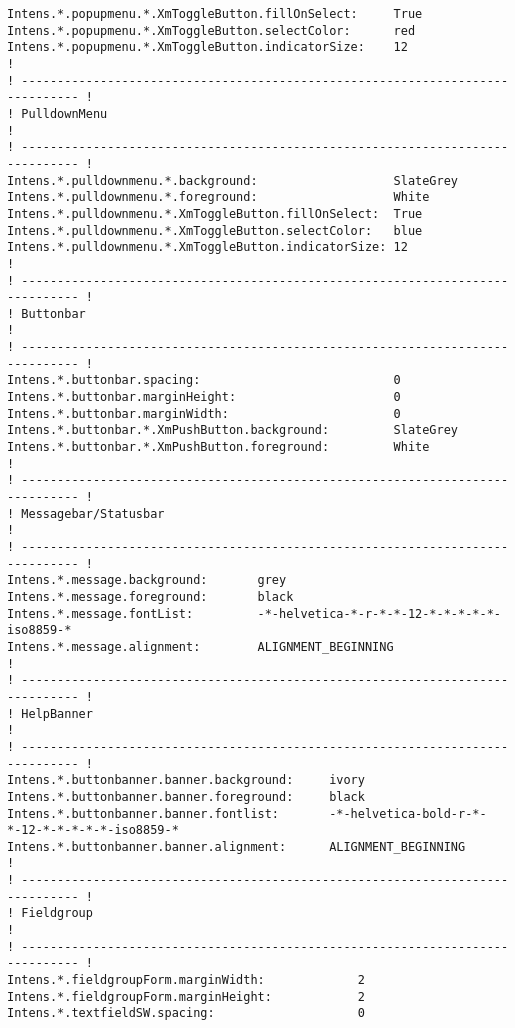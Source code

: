 {\begin{verbatim}
Intens.*.popupmenu.*.XmToggleButton.fillOnSelect:     True
Intens.*.popupmenu.*.XmToggleButton.selectColor:      red
Intens.*.popupmenu.*.XmToggleButton.indicatorSize:    12
!
! ------------------------------------------------------------------------------ !
! PulldownMenu                                                                   !
! ------------------------------------------------------------------------------ !
Intens.*.pulldownmenu.*.background:                   SlateGrey
Intens.*.pulldownmenu.*.foreground:                   White
Intens.*.pulldownmenu.*.XmToggleButton.fillOnSelect:  True
Intens.*.pulldownmenu.*.XmToggleButton.selectColor:   blue
Intens.*.pulldownmenu.*.XmToggleButton.indicatorSize: 12
!
! ------------------------------------------------------------------------------ !
! Buttonbar                                                                      !
! ------------------------------------------------------------------------------ !
Intens.*.buttonbar.spacing:                           0
Intens.*.buttonbar.marginHeight:                      0
Intens.*.buttonbar.marginWidth:                       0
Intens.*.buttonbar.*.XmPushButton.background:         SlateGrey
Intens.*.buttonbar.*.XmPushButton.foreground:         White
!
! ------------------------------------------------------------------------------ !
! Messagebar/Statusbar                                                           !
! ------------------------------------------------------------------------------ !
Intens.*.message.background:       grey
Intens.*.message.foreground:       black
Intens.*.message.fontList:         -*-helvetica-*-r-*-*-12-*-*-*-*-*-iso8859-*
Intens.*.message.alignment:        ALIGNMENT_BEGINNING
!
! ------------------------------------------------------------------------------ !
! HelpBanner                                                                     !
! ------------------------------------------------------------------------------ !
Intens.*.buttonbanner.banner.background:     ivory
Intens.*.buttonbanner.banner.foreground:     black
Intens.*.buttonbanner.banner.fontlist:       -*-helvetica-bold-r-*-*-12-*-*-*-*-*-iso8859-*
Intens.*.buttonbanner.banner.alignment:      ALIGNMENT_BEGINNING
!
! ------------------------------------------------------------------------------ !
! Fieldgroup                                                                     !
! ------------------------------------------------------------------------------ !
Intens.*.fieldgroupForm.marginWidth:             2
Intens.*.fieldgroupForm.marginHeight:            2
Intens.*.textfieldSW.spacing:                    0

\end{verbatim}}
